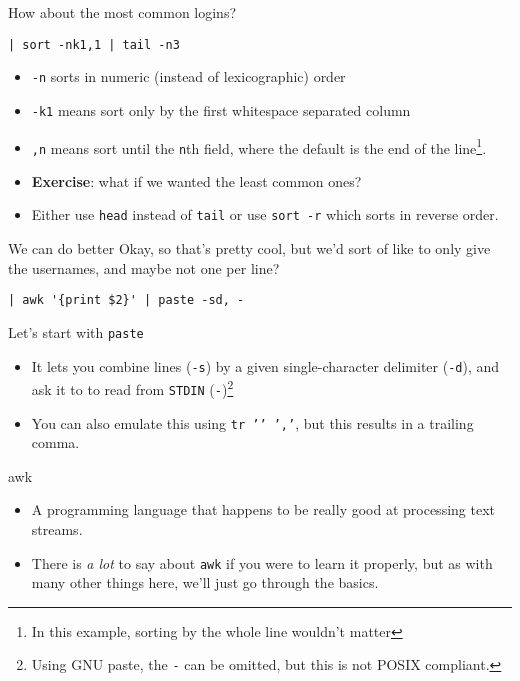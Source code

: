\documentclass[12pt]{beamer}
\begin{document}
\begin{frame}[fragile]{How about the most common logins?}
  \begin{verbatim}
| sort -nk1,1 | tail -n3
  \end{verbatim}
  \begin{itemize}
    \item \texttt{-n} sorts in numeric (instead of lexicographic) order
    \item \texttt{-k1} means sort only by the first whitespace separated column
    \item \texttt{,n} means sort until the \texttt{n}th field, where the default is the end of the line\footnote{In this example, sorting by the whole line wouldn’t matter}.
    \item \textbf{Exercise}: what if we wanted the least common ones?\pause
    \item Either use \texttt{head} instead of \texttt{tail} or use \texttt{sort -r} which sorts in reverse order.
  \end{itemize}
\end{frame}

\begin{frame}[fragile]{We can do better}
  Okay, so that’s pretty cool, but we’d sort of like to only give the usernames, and maybe not one per line?
  \begin{verbatim}
| awk '{print $2}' | paste -sd, -
  \end{verbatim}
  Let's start with \texttt{paste}
  \begin{itemize}
    \item It lets you combine lines (\texttt{-s}) by a given single-character delimiter (\texttt{-d}), and ask it to to read from \texttt{STDIN} (\texttt{-})\footnote{Using GNU paste, the \texttt{-} can be omitted, but this is not POSIX compliant.}
    \item You can also emulate this using \texttt{tr '\n' ','}, but this results in a trailing comma.
  \end{itemize}
\end{frame}

\begin{frame}{awk}
  \begin{itemize}
    \item A programming language that happens to be really good at processing text streams.
    \item There is \emph{a lot} to say about \texttt{awk} if you were to learn it properly, but as with many other things here, we’ll just go through the basics.
  \end{itemize}
\end{frame}
\end{document}
